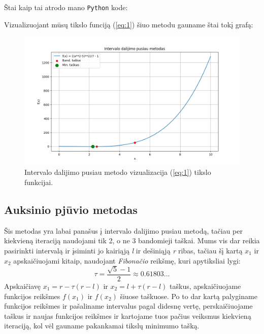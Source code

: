 \documentclass{article}
\begin{document}
Štai kaip tai atrodo mano \lstinline|Python| kode:

Vizualizuojant mūsų tikslo funciją (\ref{eq:1}) šiuo metodu gauname štai tokį grafą:
\begin{figure}[H]
    \centering
    \includegraphics[width=1\textwidth]{Figure_1.png}
    \caption{Intervalo dalijimo pusiau metodo vizualizacija (\ref{eq:1}) tikslo funkcijai.}
    \label{fig:1}
\end{figure}
\subsection{Auksinio pjūvio metodas}
Šis metodas yra labai panašus į intervalo dalijimo pusiau metodą, tačiau per kiekvieną iteraciją naudojami tik 2, o ne 3 bandomieji taškai. Mums vis dar reikia pasirinkti intervalą ir įsiminti jo kairiąją \textit{l} ir dešiniąją \textit{r} ribas, tačiau šį kartą $x_{1}$ ir $x_{2}$ apskaičiuojami kitaip, naudojant \textit{Fibonačio} reikšmę, kuri apytiksliai lygi:
\begin{equation*}
    \tau = \frac{\sqrt{5}-1}{2} \approx 0.61803...
\end{equation*}
Apskaičiavę $x_{1}=r-\tau(r-l)$ ir $x_{2}=l+\tau(r-l)$ taškus, apskaičiuojame funkcijos reikšmes $f(x_{1})$ ir $f(x_{2})$ šiuose taškuose. Po to dar kartą palyginame funkcijos reikšmes ir pašaliname intervalus pagal didesnę vertę, perskaičiuojame taškus ir naujas funkcijos reikšmes ir kartojame tuos pačius veiksmus kiekvieną iteraciją, kol vėl gauname pakankamai tikslų minimumo tašką.
\end{document}

